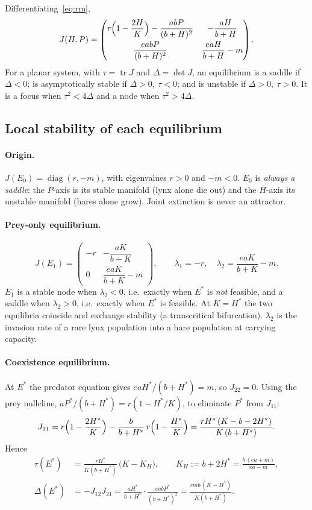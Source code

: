 Differentiating~\eqref{eq:rm},
\begin{equation}\label{eq:jac}
J(H,P)=\begin{pmatrix}
r\Bigl(1-\dfrac{2H}{K}\Bigr)-\dfrac{abP}{(b+H)^2} & -\dfrac{aH}{b+H}\\[2ex]
\dfrac{eabP}{(b+H)^2} & \dfrac{eaH}{b+H}-m
\end{pmatrix}.
\end{equation}
For a planar system, with $\tau=\operatorname{tr}J$ and $\Delta=\det J$, an equilibrium is a
saddle if $\Delta<0$; is asymptotically stable if $\Delta>0,\ \tau<0$; and is unstable if
$\Delta>0,\ \tau>0$. It is a focus when $\tau^2<4\Delta$ and a node when $\tau^2>4\Delta$.

\subsection{Local stability of each equilibrium}

\paragraph{Origin.} $J(E_0)=\operatorname{diag}(r,-m)$, with eigenvalues $r>0$ and $-m<0$.
$E_0$ is \emph{always a saddle}: the $P$-axis is its stable manifold (lynx alone die out) and the
$H$-axis its unstable manifold (hares alone grow). Joint extinction is never an attractor.

\paragraph{Prey-only equilibrium.}
\[
J(E_1)=\begin{pmatrix}-r & -\dfrac{aK}{b+K}\\[1.5ex] 0 & \dfrac{eaK}{b+K}-m\end{pmatrix},
\qquad
\lambda_1=-r,\quad \lambda_2=\frac{eaK}{b+K}-m .
\]
$E_1$ is a stable node when $\lambda_2<0$, i.e.\ exactly when $E^*$ is \emph{not} feasible, and a
saddle when $\lambda_2>0$, i.e.\ exactly when $E^*$ is feasible. At $K=H^*$ the two equilibria
coincide and exchange stability (a transcritical bifurcation). $\lambda_2$ is the invasion rate
of a rare lynx population into a hare population at carrying capacity.

\paragraph{Coexistence equilibrium.}
At $E^*$ the predator equation gives $eaH^*/(b+H^*)=m$, so $J_{22}=0$. Using the prey nullcline,
$aP^*/(b+H^*)=r(1-H^*/K)$, to eliminate $P^*$ from $J_{11}$:
\[
J_{11}=r\Bigl(1-\frac{2H^*}{K}\Bigr)-\frac{b}{b+H^*}\,r\Bigl(1-\frac{H^*}{K}\Bigr)
=\frac{rH^*\,(K-b-2H^*)}{K\,(b+H^*)} .
\]
Hence
\begin{align}
\tau(E^*) &= \frac{rH^*}{K(b+H^*)}\,\bigl(K-K_H\bigr),
\qquad K_H := b+2H^* = \frac{b\,(ea+m)}{ea-m}, \label{eq:trace}\\
\Delta(E^*) &= -J_{12}J_{21} = \frac{aH^*}{b+H^*}\cdot\frac{eabP^*}{(b+H^*)^2}
= \frac{rmb\,(K-H^*)}{K(b+H^*)}. \label{eq:det}
\end{align}

